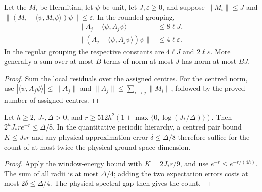 \begin{lemma}
    \label{thm:hastings_periodic_linear_pair_bounds}
    \leanok
    Let the $M_i$ be Hermitian, let $\psi$ be unit, let $J,\varepsilon\ge0$, and suppose
    $\|M_i\|\le J$ and
    $\|(M_i-\langle\psi,M_i\psi\rangle)\psi\|\le\varepsilon$.
    In the rounded grouping,
    \begin{align*}
        \|A_j-\langle\psi,A_j\psi\rangle\|       & \le8\ell J,          \\
        \|(A_j-\langle\psi,A_j\psi\rangle)\psi\| & \le4\ell\varepsilon.
    \end{align*}
    In the regular grouping the respective constants are $4\ell J$
    and $2\ell\varepsilon$. More generally a sum over at most $B$ terms
    of norm at most $J$ has norm at most $BJ$.
\end{lemma}
\begin{proof}\leanok
    Sum the local residuals over the assigned centres. For the centred
    norm, use $|\langle\psi,A_j\psi\rangle|\le\|A_j\|$ and
    $\|A_j\|\le\sum_{i\mapsto j}\|M_i\|$, followed by the proved
    number of assigned centres.
\end{proof}

\begin{lemma}
    \label{thm:hastings_periodic_linear_truncation_error}
    \leanok
    Let $h\ge2$, $J_*,\Delta>0$, and
    $r\ge512h^2(1+\max\{0,\log(J_*/\Delta)\})$. Then
    $2^hJ_*r e^{-r}\le\Delta/8$.
    In the quantitative periodic hierarchy, a centred pair bound
    $K\le J_*r$ and any physical approximation error
    $\delta\le\Delta/8$ therefore suffice for the count of at most
    twice the physical ground-space dimension.
\end{lemma}
\begin{proof}\leanok
    Apply the window-energy bound with $K=2J_*r/9$, and use
    $e^{-r}\le e^{-r/(4h)}$. The sum of all radii is at most
    $\Delta/4$; adding the two expectation errors costs at most
    $2\delta\le\Delta/4$. The physical spectral gap then gives the count.
\end{proof}

